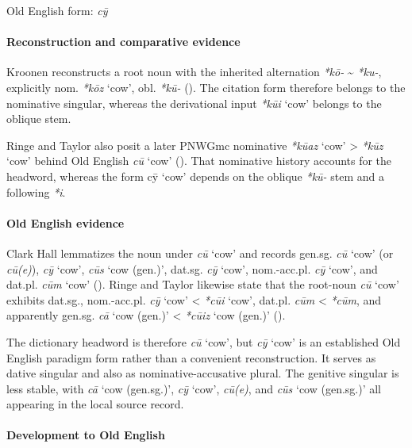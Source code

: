 \documentclass[
  british,
  a4paper,
]{article}
\providecommand{\Recon}[1]{\emph{*#1}}
\begin{document}
Old English form: \emph{cȳ}

\paragraph{Reconstruction and comparative
evidence}\label{reconstruction-and-comparative-evidence-129}

Kroonen reconstructs a root noun with the inherited alternation
\emph{*kō-} \textasciitilde{} \emph{*ku-}, explicitly nom.
\emph{\Recon{kōz}} `cow', obl. \emph{*kū-}
(). The citation form
therefore belongs to the nominative singular, whereas the derivational
input \Recon{kūi} `cow' belongs to the oblique stem.

Ringe and Taylor also posit a later PNWGmc nominative \Recon{kūaz} `cow'
\textgreater{} \Recon{kūz} `cow' behind Old English {\emph{cū}} `cow'
().
That nominative history accounts for the headword, whereas the form cȳ
`cow' depends on the oblique \emph{*kū-} stem and a following \emph{*i}.

\paragraph{Old English evidence}\label{old-english-evidence-131}

Clark Hall lemmatizes the noun under {\emph{cū}} `cow' and records
gen.sg. {\emph{cū}} `cow' (or {\emph{cū(e)}}), {\emph{cȳ}} `cow',
{\emph{cūs}} `cow (gen.)', dat.sg. {\emph{cȳ}} `cow', nom.-acc.pl.
{\emph{cȳ}} `cow', and dat.pl. \emph{cūm} `cow'
(). Ringe and Taylor
likewise state that the root-noun {\emph{cū}} `cow' exhibits dat.sg.,
nom.-acc.pl. {\emph{cȳ}} `cow' \textless{} \Recon{cūi} `cow', dat.pl.
\emph{cūm} \textless{} \emph{*cūm}, and apparently gen.sg. {\emph{cā}}
`cow (gen.)' \textless{} \Recon{cūiz} `cow (gen.)'
().

The dictionary headword is therefore {\emph{cū}} `cow', but {\emph{cȳ}}
`cow' is an established Old English paradigm form rather than a
convenient reconstruction. It serves as dative singular and also as
nominative-accusative plural. The genitive singular is less stable, with
{\emph{cā}} `cow (gen.sg.)', {\emph{cȳ}} `cow', \emph{cū(e)}, and
{\emph{cūs}} `cow (gen.sg.)' all appearing in the local source record.

\paragraph{Development to Old
English}\label{development-to-old-english-129}
\end{document}
